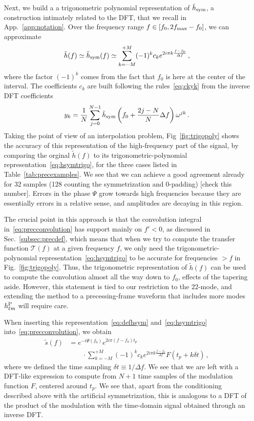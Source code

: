 \documentclass[aps,showpacs,twocolumn,
prd,superscriptaddress,nofootinbib]{revtex4-1}
\newcommand{\be}{\begin{equation}}
\newcommand{\ee}{\end{equation}}
\newcommand\calT{{\mathcal{T}}}
\newcommand{\nn}{\nonumber}
\newcommand{\SM}[1]{{\color{Red} #1}}
\begin{document}
Next, we build a a trigonometric polynomial representation of $\tilde{h}_{\rm sym}$, a construction intimately related to the DFT, that we recall in App.~\ref{app:notation}. Over the frequency range $f\in [f_{0}, 2f_{\rm max} - f_{0}]$, we can approximate
\be\label{eq:hsymtrigo}
	\tilde{h}(f) \simeq \tilde{h}_{\rm sym } (f) \simeq \sum\limits_{k=-M}^{+M} (-1)^{k} c_{k} e^{2i\pi k \frac{f-f_{0}}{\Delta f}} \,,
\ee
where the factor $(-1)^{k}$ comes from the fact that $f_{0}$ is here at the center of the interval. The coefficients $c_{k}$ are built following the rules~\eqref{eq:ckyk} from the inverse DFT coefficients
\be\label{eq:ykDFTprec}
	y_{k} = \frac{1}{N} \sum\limits_{j=0}^{N-1} \tilde{h}_{\rm sym}\left( f_{0} + \frac{2j - N}{N} \Delta f \right) \omega^{jk} \,.
\ee
Taking the point of view of an interpolation problem, Fig~\ref{fig:trigopoly} shows the accuracy of this representation of the high-frequency part of the signal, by comparing the orginal $\tilde{h}(f)$ to its  trigonometric-polynomial representation~\eqref{eq:hsymtrigo}, for the three cases listed in Table~\ref{tab:precexamples}. We see that we can achieve a good agreement already for 32 samples (128 counting the symmetrization and 0-padding) \SM{[check this number]}. Errors in the phase $\Psi$ grow towards high frequencies because they are essentially errors in a relative sense, and amplitudes are decaying in this region.

The crucial point in this approach is that the convolution integral in~\eqref{eq:precconvolution} has support mainly on $f'<0$, as discussed in Sec.~\ref{subsec:precdef}, which means that when we try to compute the transfer function $\calT(f)$ at a given frequency $f$, we only need the trigonometric-polynomial representation~\eqref{eq:hsymtrigo} to be accurate for frequencies $>f$ in Fig.~\ref{fig:trigopoly}. Thus, the trigonometric representation of $\tilde{h}(f)$ can be used to compute the convolution almost all the way down to $f_{0}$, effects of the tapering aside. However, this statement is tied to our restriction to the $22$-mode, and extending the method to a precessing-frame waveform that includes more modes $h^{\rm P}_{\ell m}$ will require care.

When inserting this representation~\eqref{eq:defhsym} and~\eqref{eq:hsymtrigo} into~\eqref{eq:precconvolution}, we obtain
\begin{align}\label{eq:resultdirectconvol}
	\tilde{s}(f) &= e^{-i \Psi(f_{0})} e^{2i\pi (f-f_{0}) t_{p}} \nn\\
	& \qquad \cdot\sum\limits_{k=-M}^{+M} (-1)^{k} c_{k} e^{2i\pi k \frac{f-f_{0}}{\Delta f}} F(t_{p} + k\delta t) \,, 
\end{align}
where we defined the time sampling $\delta t \equiv 1/\Delta f$. We see that we are left with a DFT-like expression to compute from $N+1$ time samples of the modulation function $F$, centered around $t_{p}$. We see that, apart from the conditioning described above with the artificial symmetrization, this is analogous to a DFT of the product of the modulation with the time-domain signal obtained through an inverse DFT. 
\end{document}
